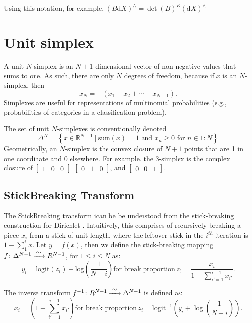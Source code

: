\documentclass[11pt]{article}
\newcommand{\setcomp}[2]{\left\{ #1 \ \Big|\ #2 \right\}}
\newcommand{\rngto}[1]{1{:}#1}
\newcommand{\dv}[1]{\mathrm{d}{#1}}
\begin{document}
Using this notation, for example, $(B \dv{X})^\wedge = \det(B)^K (\dv{X})^\wedge$

\section{Unit simplex}

A unit $N$-simplex is an $N + 1$-dimensional vector of non-negative
values that sums to one.  As such, there are only $N$ degrees of
freedom, because if $x$ is an $N$-simplex, then
\[
  x_N = -(x_1 + x_2 + \cdots + x_{N-1}).
\]
Simplexes are useful for representations of multinomial probabilities
(e.g., probabilities of categories in a classification problem).

The set of unit $N$-simplexes is conventionally denoted
\[
  \Delta^N = \setcomp{x \in \mathbb{R}^{N + 1}}{\textrm{sum}(x) = 1
    \textrm{ and }
    x_n \geq 0 \textrm{ for } n \in \rngto{N}}
\]
Geometrically, an $N$-simplex is the convex closure of $N+1$ points
that are 1 in one coordinate and 0 elsewhere.  For example, the
3-simplex is the complex closure of
$\begin{bmatrix}1 & 0 & 0 \end{bmatrix},
\begin{bmatrix} 0 & 1 & 0 \end{bmatrix}$,
and $\begin{bmatrix} 0 & 0 & 1 \end{bmatrix}$.

\subsection{StickBreaking Transform}

The StickBreaking transform ican be be understood from the stick-breaking construction for Dirichlet \cite{sethurman}. Intuitively, this comprises of recursively breaking a piece $x_i$ from a stick of unit length, where the leftover stick in the $i^{th}$ iteration is $ 1 - \sum_{1}^{i}x$. Let $y = f(x)$, then we define the stick-breaking mapping $ f \colon \Delta^{N-1} \xrightarrow{\makebox[0.4cm]{$\sim$}}  R^{N-1}$, for $1 \leq i \leq N$ as:	
\[
y_i
= \mathrm{logit}(z_i) - \mbox{log}\left(\frac{1}{N-i}
   \right) \text{for break proportion} \, 
   z_i = \frac{x_i}{1 - \sum_{i' = 1}^{i-1} x_{i'}}.
\]

The inverse transform $ f^{-1} \colon R^{N-1} \xrightarrow{\makebox[0.4cm]{$\sim$}}  \Delta^{N-1}$ is defined as:
\[
x_i =
\left( 1 - \sum_{i'=1}^{i-1} x_{i'} \right) \text{for break proportion} \, z_i = \mathrm{logit}^{-1} \left( y_i
                             + \log \left( \frac{1}{N - i}
                                            \right)\right).
                                            \]
                            
\end{document}
